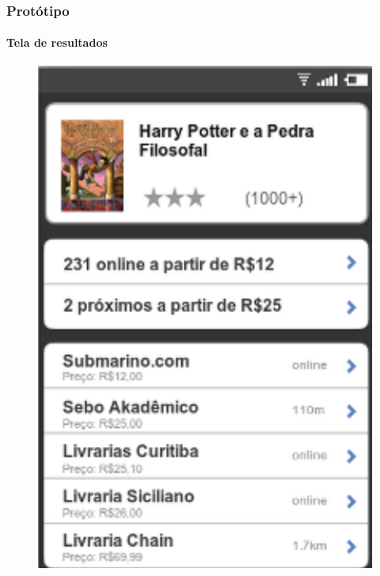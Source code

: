 \documentclass[14pt,beamer]{beamer}
\begin{document}
\begin{frame}
	\frametitle{Protótipo}
	\framesubtitle{Tela de resultados}

    \vspace{-5px}
    \begin{figure}
        \centering
        \includegraphics[scale=.71]{tela/Tela}
    \end{figure}
\end{frame}
\end{document}
